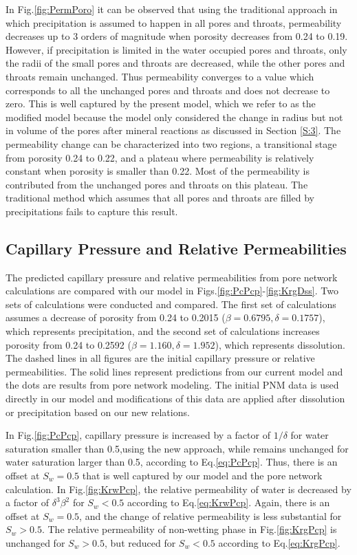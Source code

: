 \documentclass[preprint,12pt,authoryear]{elsarticle}
\begin{document}
In Fig.\ref{fig:PermPoro} it can be observed that using the traditional approach in which precipitation is assumed to happen in all pores and throats, permeability decreases up to 3 orders of magnitude when porosity decreases from 0.24 to 0.19. However, if precipitation is limited in the water occupied pores and throats, only the radii of the small pores and throats are decreased, while the other pores and throats remain unchanged. Thus permeability converges to a value which corresponds to all the unchanged pores and throats and does not decrease to zero. This is well captured by the present model, which we refer to as the modified \cite{liu2013permeability} model because the \cite{liu2013permeability} model only considered the change in radius but not in volume of the pores after mineral reactions as discussed in Section \ref{S:3}. The permeability change can be characterized into two regions, a transitional stage from porosity 0.24 to 0.22, and a plateau where permeability is relatively constant when porosity is smaller than 0.22. Most of the permeability is contributed from the unchanged pores and throats on this plateau. The traditional method which assumes that all pores and throats are filled by precipitations fails to capture this result.

\subsection{Capillary Pressure and Relative Permeabilities}
The predicted capillary pressure and relative permeabilities from pore network calculations are compared with our model in Figs.\ref{fig:PcPcp}-\ref{fig:KrgDss}. Two sets of calculations were conducted and compared. The first set of calculations assumes a decrease of porosity from 0.24 to 0.2015 ($\beta=0.6795,\delta=0.1757$), which represents precipitation, and the second set of calculations increases porosity from 0.24 to 0.2592 ($\beta=1.160,\delta=1.952$), which represents dissolution. The dashed lines in all figures are the initial capillary pressure or relative permeabilities. The solid lines represent predictions from our current model and the dots are results from pore network modeling. The initial PNM data is used directly in our model and modifications of this data are applied after dissolution or precipitation based on our new relations. 

In Fig.\ref{fig:PcPcp}, capillary pressure is increased by a factor of $1/\delta$ for water saturation smaller than 0.5,using the new approach, while remains unchanged for water saturation larger than 0.5, according to Eq.\ref{eq:PcPcp}. Thus, there is an offset at $S_w=0.5$ that is well captured by our model and the pore network calculation. In Fig.\ref{fig:KrwPcp}, the relative permeability of water is decreased by a factor of $\delta^3\beta^2$ for $S_w<0.5$ according to Eq.\ref{eq:KrwPcp}. Again, there is an offset at $S_w=0.5$, and the change of relative permeability is less substantial for $S_w>0.5$. The relative permeability of non-wetting phase in Fig.\ref{fig:KrgPcp} is unchanged for $S_w>0.5$, but reduced for $S_w<0.5$ according to Eq.\ref{eq:KrgPcp}. 
\end{document}

